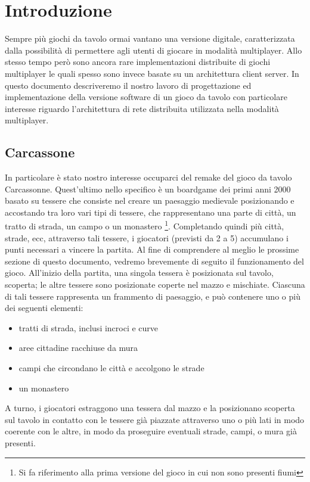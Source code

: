 \section{Introduzione}
Sempre più giochi da tavolo ormai vantano una versione digitale,
caratterizzata dalla possibilità di permettere agli utenti di giocare in
modalità multiplayer.
Allo stesso tempo però sono ancora rare implementazioni distribuite di
giochi multiplayer le quali spesso sono invece basate su un architettura
client server. In questo documento descriveremo il nostro lavoro di
progettazione ed implementazione della versione software di un gioco da
tavolo con particolare interesse riguardo l'architettura di rete
distribuita utilizzata nella modalità multiplayer.

\subsection{Carcassone}
In particolare è stato nostro interesse occuparci del remake del gioco
da tavolo Carcassonne. Quest'ultimo nello specifico è un boardgame dei
primi anni 2000 basato su tessere che consiste nel creare un paesaggio medievale 
posizionando e accostando tra loro vari tipi di tessere, che rappresentano una parte di città, 
un tratto di strada, un campo o un monastero \footnote{Si fa riferimento
alla prima versione del gioco in cui non sono presenti fiumi}.
Completando quindi più città, strade, ecc, attraverso tali tessere, i
giocatori (previsti da 2 a 5) accumulano i punti necessari a vincere la partita.
Al fine di comprendere al meglio le prossime sezione di questo documento, 
vedremo
brevemente di seguito il funzionamento del gioco.
All'inizio della partita, una singola tessera è posizionata sul tavolo, scoperta; 
le altre tessere sono posizionate coperte nel mazzo e mischiate.
Ciascuna di tali tessere rappresenta un frammento di paesaggio, e può contenere uno o più dei seguenti elementi:

\begin{itemize}
	\item tratti di strada, inclusi incroci e curve
    \item aree cittadine racchiuse da mura
    \item campi che circondano le città e accolgono le strade
    \item un monastero
\end{itemize}

A turno, i giocatori estraggono una tessera dal mazzo e la posizionano scoperta sul tavolo
in contatto con le tessere già piazzate attraverso uno o più lati in modo coerente con le altre, 
in modo da proseguire eventuali strade, campi, o mura già presenti.

